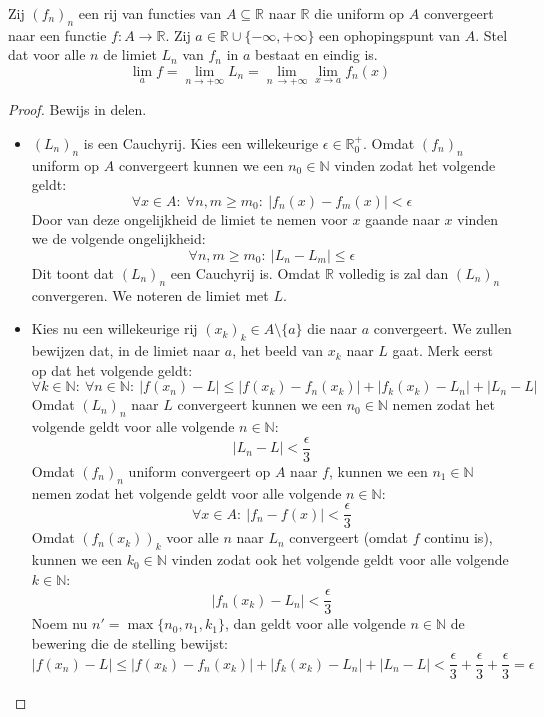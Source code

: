 \documentclass[main.tex]{subfiles}
\begin{document}
\begin{bst}
  Zij $(f_{n})_{n}$ een rij van functies van $A \subseteq \mathbb{R}$ naar $\mathbb{R}$ die uniform op $A$ convergeert naar een functie $f: A \rightarrow \mathbb{R}$.
  Zij $a\in \mathbb{R} \cup \{-\infty,+\infty\}$ een ophopingspunt van $A$.
  Stel dat voor alle $n$ de limiet $L_{n}$ van $f_{n}$ in $a$ bestaat en eindig is.
  \[ \lim_{a}f = \lim_{n \rightarrow +\infty} L_{n} = \lim_{n\ \rightarrow +\infty} \lim_{x \rightarrow a} f_{n}(x) \]

  \begin{proof}
    Bewijs in delen.
    \begin{itemize}
    \item $(L_{n})_{n}$ is een Cauchyrij.
      Kies een willekeurige $\epsilon \in \mathbb{R}_{0}^{+}$.
      Omdat $(f_{n})_{n}$ uniform op $A$ convergeert kunnen we een $n_{0}\in \mathbb{N}$ vinden zodat het volgende geldt:
      \[ \forall x\in A:\ \forall n,m \ge m_{0}:\ |f_{n}(x) -f_{m}(x)| < \epsilon \]
      Door van deze ongelijkheid de limiet te nemen voor $x$ gaande naar $x$ vinden we de volgende ongelijkheid:
      \[ \forall n,m \ge m_{0}:\ |L_{n}-L_{m}| \le \epsilon \]
      Dit toont dat $(L_{n})_{n}$ een Cauchyrij is.
      Omdat $\mathbb{R}$ volledig is zal dan $(L_{n})_{n}$ convergeren.
      We noteren de limiet met $L$.
    \item 
      Kies nu een willekeurige rij $(x_{k})_{k} \in A\setminus \{a\}$ die naar $a$ convergeert.
      We zullen bewijzen dat, in de limiet naar $a$, het beeld van $x_{k}$ naar $L$ gaat.
      Merk eerst op dat het volgende geldt:
      \[ \forall k\in \mathbb{N}:\ \forall n\in \mathbb{N}:\ |f(x_{n})-L| \le |f(x_{k}) -f_{n}(x_{k})| + |f_{k}(x_{k})-L_{n}| + |L_{n}-L| \]
      Omdat $(L_{n})_{n}$ naar $L$ convergeert kunnen we een $n_{0}\in\mathbb{N}$ nemen zodat het volgende geldt voor alle volgende $n\in \mathbb{N}$:
      \[ |L_{n}-L| < \frac{\epsilon}{3} \]
      Omdat $(f_{n})_{n}$ uniform convergeert op $A$ naar $f$, kunnen we een $n_{1}\in \mathbb{N}$ nemen zodat het volgende geldt voor alle volgende $n\in \mathbb{N}$:
      \[ \forall x\in A:\ |f_{n}-f(x)| < \frac{\epsilon}{3} \]
      Omdat $(f_{n}(x_{k}))_{k}$ voor alle $n$ naar $L_{n}$ convergeert (omdat $f$ continu is), kunnen we een $k_{0} \in \mathbb{N}$ vinden zodat ook het volgende geldt voor alle volgende $k \in \mathbb{N}$:
      \[ |f_{n}(x_{k}) - L_{n}| < \frac{\epsilon}{3} \]
      Noem nu $n' = \max\{n_{0},n_{1},k_{1}\}$, dan geldt voor alle volgende $n\in \mathbb{N}$ de bewering die de stelling bewijst:
      \[ |f(x_{n})-L| \le |f(x_{k}) -f_{n}(x_{k})| + |f_{k}(x_{k})-L_{n}| + |L_{n}-L| < \frac{\epsilon}{3} + \frac{\epsilon}{3} + \frac{\epsilon}{3} = \epsilon \]
    \end{itemize}
  \end{proof}
\end{bst}
\end{document}
